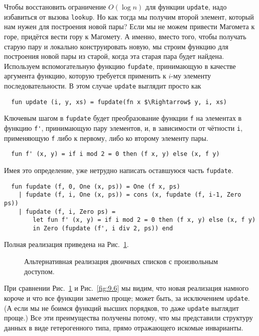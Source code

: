 Чтобы восстановить ограничение $O(\log n)$ для функции
\lstinline!update!, надо избавиться от вызова
\lstinline!lookup!. Но как тогда мы получим второй элемент, который
нам нужен для построения новой пары? Если мы не можем привести
Магомета к горе, придётся вести гору к Магомету. А именно, вместо
того, чтобы получать старую пару и локально конструировать новую, мы
строим функцию для построения новой пары из старой, когда эта старая
пара будет найдена. Используем вспомогательную функцию
\lstinline!fupdate!, принимающую в качестве аргумента функцию, которую
требуется применить к $i$-му элементу последовательности. В этом
случае \lstinline!update! выглядит просто как
\begin{lstlisting}
  fun update (i, y, xs) = fupdate(fn x $\Rightarrow$ y, i, xs)
\end{lstlisting}
Ключевым шагом в \lstinline!fupdate! будет преобразование функции
\lstinline!f! на элементах в функцию \lstinline!f'!, принимающую пару
элементов, и, в зависимости от чётности \lstinline!i!, применяющую
\lstinline!f! либо к первому, либо ко второму элементу пары.
\begin{lstlisting}
  fun f' (x, y) = if i mod 2 = 0 then (f x, y) else (x, f y)
\end{lstlisting}
Имея это определение, уже нетрудно написать оставшуюся часть
\lstinline!fupdate!.
\begin{lstlisting}
  fun fupdate (f, 0, One (x, ps)) = One (f x, ps)
    | fupdate (f, i, One (x, ps)) = cons (x, fupdate (f, i-1, Zero ps))
    | fupdate (f, i, Zero ps) =
        let fun f' (x, y) = if i mod 2 = 0 then (f x, y) else (x, f y)
        in Zero (fupdate (f', i div 2, ps)) end
\end{lstlisting}
Полная реализация приведена на Рис.~\ref{fig:10.1}.

\begin{figure}
  \centering
  
  \caption{Альтернативная реализация двоичных списков с произвольным доступом.}
  \label{fig:10.1}
\end{figure}

При сравнении Рис.~\ref{fig:10.1} и Рис.~\ref{fig:9.6} мы видим, что
новая реализация намного короче и что все функции заметно проще; может
быть, за исключением \lstinline!update!. (А если мы не боимся функций
высших порядков, то даже \lstinline!update! выглядит проще.) Все эти
преимущества получены потому, что мы представили структуру данных
в виде гетерогенного типа, прямо отражающего искомые инварианты.

